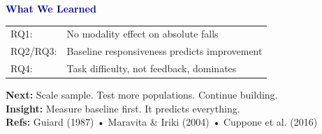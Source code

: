 \documentclass{beamer}
\begin{document}
\begin{frame}[plain]
  \vspace{0.6cm}
  \centering

  \textcolor{darkblue}{\Large \textbf{What We Learned}}

  \vspace{0.6cm}

  {\small
    \begin{tabular}{ll}
      RQ1: & No modality effect on absolute falls \\
      RQ2/RQ3: & Baseline responsiveness predicts improvement \\
      RQ4: & Task difficulty, not feedback, dominates \\
    \end{tabular}
  }

  \vspace{0.8cm}


  \vspace{0.6cm}

  {\tiny
    \textbf{Next:} Scale sample. Test more populations. Continue building. \\
    \textbf{Insight:} Measure baseline first. It predicts everything. \\[0.2cm]
    \textbf{Refs:} Guiard (1987) • Maravita \& Iriki (2004) • Cuppone et al. (2016)
  }
\end{frame}
\end{document}
